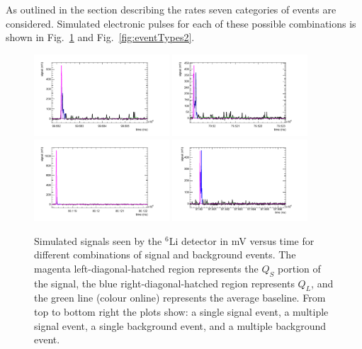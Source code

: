 \documentclass[review]{elsarticle}
\begin{document}
As outlined in the section describing the rates seven categories of
events are considered.  Simulated electronic pulses for each of these
possible combinations is shown in Fig.~\ref{fig:eventTypes} and
Fig.~\ref{fig:eventTypes2}.

\begin{figure}[!htpb]
\centering
\includegraphics[width=0.45\textwidth]{figures/signal1.pdf}
\includegraphics[width=0.45\textwidth]{figures/mixed1.pdf}
\includegraphics[width=0.45\textwidth]{figures/gamma1.pdf}
\includegraphics[width=0.45\textwidth]{figures/gammapileup1.pdf}
\caption{ Simulated signals seen by the $^{6}$Li detector in mV versus
  time for different combinations of signal and background events.
  The magenta left-diagonal-hatched region represents the $Q_S$
  portion of the signal, the blue right-diagonal-hatched region
  represents $Q_L$, and the green line (colour online) represents the
  average baseline.  From top to bottom right the plots show: a single
  signal event, a multiple signal event, a single background event,
  and a multiple background event. }\label{fig:eventTypes}
\end{figure}
\end{document}
